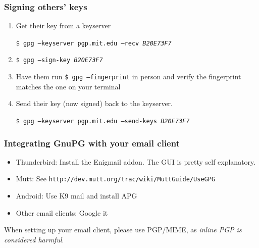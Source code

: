 \documentclass{beamer}
\begin{document}
\begin{frame}
    \frametitle{Signing others' keys}
    \begin{enumerate}[<+->]
        \item Get their key from a keyserver\par
            \texttt{\small \$ gpg --keyserver pgp.mit.edu --recv \emph{B20E73F7}}
        \item \texttt{\$ gpg --sign-key \emph{B20E73F7}}
        \item Have them run \texttt{\$ gpg --fingerprint} in person and verify
            the fingerprint matches the one on your terminal
        \item Send their key (now signed) back to the keyserver.\par
            \texttt{\small \$ gpg --keyserver pgp.mit.edu --send-keys \emph{B20E73F7}}
    \end{enumerate}
\end{frame}

\begin{frame}
    \frametitle{Integrating GnuPG with your email client}
    \begin{itemize}
        \item Thunderbird: Install the Enigmail addon. The GUI is pretty self
            explanatory.
        \item Mutt: See \texttt{http://dev.mutt.org/trac/wiki/MuttGuide/UseGPG}
        \item Android: Use K9 mail and install APG
        \item Other email clients: Google it
    \end{itemize}
    When setting up your email client, please use PGP/MIME, as
    \emph{inline PGP is considered harmful}.
\end{frame}
\end{document}
